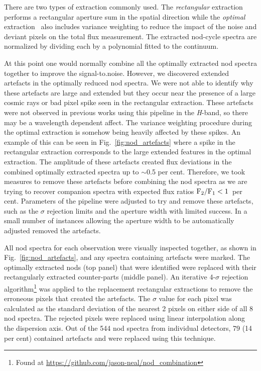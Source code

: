 \documentclass[fleqn,usenatbib]{mnras}
\begin{document}
There are two types of extraction commonly used. The \emph{rectangular} extraction performs a rectangular aperture sum in the spatial direction while the \emph{optimal} extraction~\citep{horne_optimal_1986} also includes variance weighting to reduce the impact of the noise and deviant pixels on the total flux measurement. {The extracted nod-cycle spectra are normalized by dividing each by a polynomial fitted to the continuum.}

At this point one would normally combine all the optimally extracted nod spectra together to improve the signal-to.noise. {However, we discovered extended artefacts in the optimally reduced nod spectra. We were not able to identify why these artefacts are large and extended but they occur near the presence of a large cosmic rays or bad pixel spike seen in the rectangular extraction. These artefacts were not observed in previous works using this pipeline in the \textit{H}-band, so there may be a wavelength dependent affect. The variance weighting procedure during the optimal extraction is somehow being heavily affected by these spikes.} An example of this can be seen in Fig.~\ref{fig:nod_artefacts} where a spike in the rectangular extraction corresponds to the large extended features in the optimal extraction. The amplitude of these artefacts created flux deviations in the combined optimally extracted spectra up to \(\sim\)0.5 per cent.
Therefore, we took measures to remove these artefacts before combining the nod spectra as we are trying to recover companion spectra with expected flux ratios \(\rm {F_2}/{F_1} < 1\)~per cent. {Parameters of the pipeline were adjusted to try and remove these artefacts, such as the $\sigma$ rejection limits and the aperture width with limited success. In a small number of instances allowing the aperture width to be automatically adjusted removed the artefacts.}

All nod spectra for each observation were visually inspected together, as shown in Fig.~\ref{fig:nod_artefacts}, and any spectra containing artefacts were marked. The optimally extracted nods (top panel)  that were identified were replaced with their rectangularly extracted counter-parts (middle panel). An iterative 4-\(\sigma\) rejection algorithm\footnote{Found at \url{https://github.com/jason-neal/nod_combination}} was applied to the replacement rectangular extractions to remove the erroneous pixels that created the artefacts. The \(\sigma\) value for each pixel was calculated as the standard deviation of the nearest 2 pixels on either side of all 8 nod spectra. The rejected pixels were replaced using linear interpolation along the dispersion axis. {Out of the 544 nod spectra from individual detectors, 79 (14 per cent) contained artefacts and were replaced using this technique.}
\end{document}
